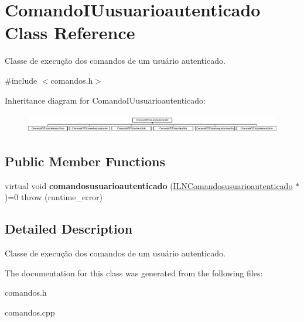 \hypertarget{classComandoIUusuarioautenticado}{}\section{Comando\+I\+Uusuarioautenticado Class Reference}
\label{classComandoIUusuarioautenticado}


Classe de execução dos comandos de um usuário autenticado.  




{\ttfamily \#include $<$comandos.\+h$>$}

Inheritance diagram for Comando\+I\+Uusuarioautenticado\+:\begin{figure}[H]
\begin{center}
\leavevmode
\includegraphics[height=0.844646cm]{classComandoIUusuarioautenticado}
\end{center}
\end{figure}
\subsection*{Public Member Functions}
\begin{DoxyCompactItemize}
\item 
\mbox{\label{classComandoIUusuarioautenticado_ac11a39764a6d618e6cc6d870e6209b14}} 
virtual void {\bfseries comandosusuarioautenticado} (\hyperlink{classILNComandosusuarioautenticado}{I\+L\+N\+Comandosusuarioautenticado} $\ast$)=0  throw (runtime\+\_\+error)
\end{DoxyCompactItemize}


\subsection{Detailed Description}
Classe de execução dos comandos de um usuário autenticado. 

The documentation for this class was generated from the following files\+:\begin{DoxyCompactItemize}
\item 
comandos.\+h\item 
comandos.\+cpp\end{DoxyCompactItemize}
